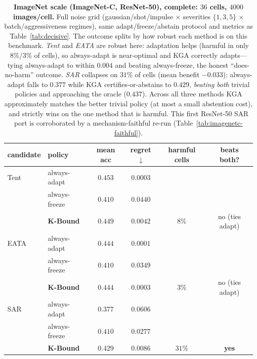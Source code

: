 \documentclass[conference]{IEEEtran}
\theoremstyle{plain}
\theoremstyle{definition}
\begin{document}
\begin{table}[t]\centering\small
\begin{tabular}{llcccc}
\toprule
candidate & policy & mean acc & regret$\downarrow$ & harmful cells & beats both? \\
\midrule
Tent & always-adapt     & $\mathbf{0.453}$ & $0.0003$ &        & \\
     & always-freeze    & $0.410$          & $0.0440$ &        & \\
     & \textbf{K-Bound} & $0.449$          & $0.0042$ & $8\%$  & no (ties adapt) \\
\midrule
EATA & always-adapt     & $\mathbf{0.444}$ & $0.0001$ &        & \\
     & always-freeze    & $0.410$          & $0.0349$ &        & \\
     & \textbf{K-Bound} & $0.444$          & $0.0003$ & $3\%$  & no (ties adapt) \\
\midrule
SAR  & always-adapt     & $0.377$          & $0.0606$ &        & \\
     & always-freeze    & $0.410$          & $0.0277$ &        & \\
     & \textbf{K-Bound} & $\mathbf{0.429}$ & $\mathbf{0.0086}$ & $31\%$ & \textbf{yes} \\
\bottomrule
\end{tabular}
\caption{\textbf{ImageNet scale (ImageNet-C, ResNet-50), complete: $36$ cells, $4000$ images/cell.}
Full noise grid (gaussian/shot/impulse $\times$ severities $\{1,3,5\}$ $\times$ batch/aggressiveness
regimes), same adapt/freeze/abstain protocol and metrics as Table~\ref{tab:decisive}. The outcome
splits by how robust each method is on this benchmark. \emph{Tent} and \emph{EATA} are robust here:
adaptation helps (harmful in only $8\%$/$3\%$ of cells), so always-adapt is near-optimal and
\textsc{KGA} correctly adapts---tying always-adapt to within $0.004$ and beating always-freeze, the
honest ``does-no-harm'' outcome. \emph{SAR} collapses on $31\%$ of cells (mean benefit $-0.033$):
always-adapt falls to $0.377$ while \textsc{KGA} certifies-or-abstains to $0.429$, \emph{beating
both} trivial policies and approaching the oracle ($0.437$). Across all three methods \textsc{KGA}
approximately matches the better trivial policy (at most a small abstention cost), and strictly wins
on the one method that is harmful.
This first ResNet-50 SAR port is corroborated by a mechanism-faithful re-run
(Table~\ref{tab:imagenetc-faithful}).}
\label{tab:imagenetc}
\end{table}
\end{document}
